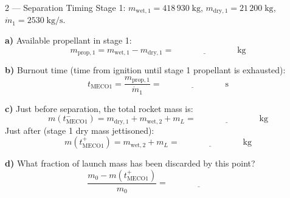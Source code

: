 \documentclass[12pt, a4paper]{article}
\begin{document}
\begin{exercisebox}{2 — Separation Timing}
Stage 1: $m_{\text{wet},1} = 418\,930\;\text{kg}$, $m_{\text{dry},1} = 21\,200\;\text{kg}$, $\dot{m}_1 = 2530\;\text{kg/s}$.

\textbf{a)} Available propellant in stage 1:
\[
  m_{\text{prop},1} = m_{\text{wet},1} - m_{\text{dry},1} = \underline{\hspace{3cm}}\;\text{kg}
\]

\textbf{b)} Burnout time (time from ignition until stage 1 propellant is exhausted):
\[
  t_\text{MECO1} = \frac{m_{\text{prop},1}}{\dot{m}_1} = \underline{\hspace{3cm}}\;\text{s}
\]

\textbf{c)} Just before separation, the total rocket mass is:
\[
  m(t_\text{MECO1}^-) = m_{\text{dry},1} + m_{\text{wet},2} + m_L = \underline{\hspace{3cm}}\;\text{kg}
\]
Just after (stage 1 dry mass jettisoned):
\[
  m(t_\text{MECO1}^+) = m_{\text{wet},2} + m_L = \underline{\hspace{3cm}}\;\text{kg}
\]

\textbf{d)} What fraction of launch mass has been discarded by this point?
\[
  \frac{m_0 - m(t_\text{MECO1}^+)}{m_0} = \underline{\hspace{3cm}}
\]
\end{exercisebox}

\begin{solutionspace}[7cm]
\end{solutionspace}
\end{document}
